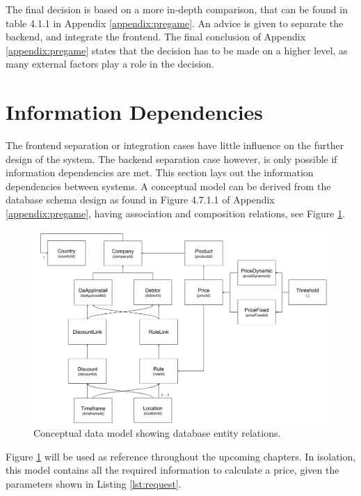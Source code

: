 The final decision is based on a more in-depth comparison, that can be found in table 4.1.1 in Appendix \ref{appendix:pregame}. An advice is given to separate the backend, and integrate the frontend. The final conclusion of Appendix \ref{appendix:pregame} states that the decision has to be made on a higher level, as many external factors play a role in the decision.

%
\section{Information Dependencies}
The frontend separation or integration cases have little influence on the further design of the system. The backend separation case however, is only possible if information dependencies are met. This section lays out the information dependencies between systems. A conceptual model can be derived from the database schema design as found in Figure 4.7.1.1 of Appendix \ref{appendix:pregame}, having association and composition relations, see Figure \ref{fig:DataModel}.

\begin{figure}[H]
	\centering
	\includegraphics[width=1\textwidth]{DataModel}
	\caption[DataModel]{Conceptual data model showing database entity relations.}
	\label{fig:DataModel}
\end{figure}

Figure \ref{fig:DataModel} will be used as reference throughout the upcoming chapters. In isolation, this model contains all the required information to calculate a price, given the parameters shown in Listing \ref{lst:request}.


